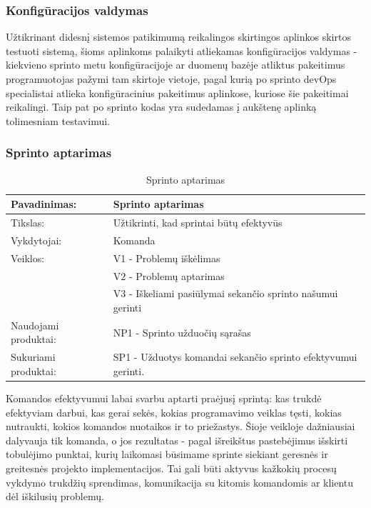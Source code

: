 \documentclass{VUMIFPSkursinis}
\begin{document}
	\subsubsection{Konfigūracijos valdymas}
	Užtikrinant didesnį sistemos patikimumą reikalingos skirtingos aplinkos skirtos testuoti sistemą, šioms aplinkoms palaikyti atliekamas konfigūracijos valdymas - kiekvieno sprinto metu konfigūracijoje ar duomenų bazėje atliktus pakeitimus programuotojas pažymi tam skirtoje vietoje, pagal kurią po sprinto devOps specialistai atlieka konfigūracinius pakeitimus aplinkose, kuriose šie pakeitimai reikalingi. Taip pat po sprinto kodas yra sudedamas į aukštenę aplinką tolimesniam testavimui.
	\subsubsection{Sprinto aptarimas}
	\begin{center}
		\begin{table}[ht]
		\caption{Sprinto aptarimas}
		\begin{tabular}{ | l | l | } 
		\hline
		Pavadinimas:         & Sprinto aptarimas                               \\ \hline
		Tikslas: 	           & Užtikrinti, kad sprintai būtų efektyvūs\\ \hline
		Vykdytojai:          & Komanda                                \\ \hline
		Veiklos:             & V1 - Problemų iškėlimas 													\\ 
						             & V2 - Problemų aptarimas \\ 
					 	             & V3 - Iškeliami pasiūlymai sekančio sprinto našumui gerinti 																			 \\ \hline
		Naudojami produktai: & NP1 - Sprinto užduočių sąrašas 																																															 \\ \hline
		Sukuriami produktai: & SP1 - Užduotys komandai sekančio sprinto efektyvumui gerinti.																											\\ \hline
		\end{tabular}
	\end{table}
		\end{center}
	Komandos efektyvumui labai svarbu aptarti praėjusį sprintą: kas trukdė efektyviam darbui, kas gerai sekės, kokias programavimo veiklas tęsti, kokias nutraukti, kokios komandos nuotaikos ir to priežastys. Šioje veikloje dažniausiai dalyvauja tik komanda, o jos rezultatas - pagal išreikštus pastebėjimus išskirti tobulėjimo punktai, kurių laikomasi būsimame sprinte siekiant geresnės ir greitesnės projekto implementacijos. Tai gali būti aktyvus kažkokių procesų vykdymo trukdžių sprendimas, komunikacija su kitomis komandomis ar klientu dėl iškilusių problemų.
\end{document}
